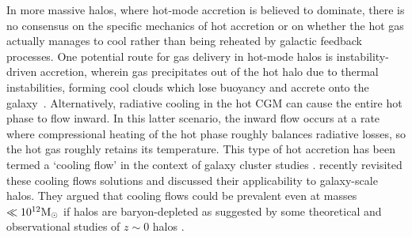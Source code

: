 \documentclass[fleqn,usenatbib]{mnras}
\newcommand{\msun}{{\rm M}_\odot}
\begin{document}
In more massive halos, where hot-mode accretion is believed to dominate, there is no consensus on the specific mechanics of hot accretion or on whether the hot gas actually manages to cool rather than being reheated by galactic feedback processes. 
One potential route for gas delivery in hot-mode halos is instability-driven accretion, wherein gas precipitates out of the hot halo due to thermal instabilities, forming cool clouds which lose buoyancy and accrete onto the galaxy~\citep[e.g.][]{Maller2004, Mccourt2012, Voit2015, Armillotta2016, Gronke2019a, Voit2021}.  
Alternatively, radiative cooling in the hot CGM can cause the entire hot phase to flow inward.
In this latter scenario, the inward flow occurs at a rate where compressional heating of the hot phase roughly balances radiative losses, so the hot gas roughly retains its temperature.
This type of hot accretion has been termed a `cooling flow' in the context of galaxy cluster studies \citep[][see \citealt{McNamara2007} for a review]{Mathews78, Cowie80, Fabian84, balbus88, Bertschinger1989}. \cite{Stern2019, Stern2020a} recently revisited these cooling flows solutions and discussed  their applicability to galaxy-scale halos.
They argued that cooling flows could be prevalent even at masses $\ll10^{12}\msun$ if halos are baryon-depleted as suggested by some theoretical and observational studies of $z\sim0$ halos \citep[e.g.,][]{Bregman2018, Hafen2019}. 

  



\end{document}

